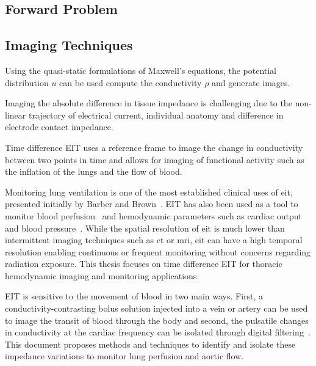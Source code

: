 \subsection{Forward Problem}

\subsection{Imaging Techniques}




Using the quasi-static 
formulations of Maxwell's equations, the potential distribution $u$ can be used 
compute the conductivity $\rho$ and generate images.


Imaging the absolute difference in tissue impedance is challenging due to the non-linear trajectory of 
electrical current, individual anatomy and difference in electrode contact impedance. 


Time difference EIT uses a reference frame to image the change in conductivity between 
two points in time and allows for imaging of functional activity such as the inflation of the lungs 
and the flow of blood.

Monitoring lung ventilation is one of the most
established clinical uses of 
\acrshort{eit}, presented initially by Barber and Brown~\parencite{Barber1984}.
EIT has also been used as a tool to monitor blood 
perfusion~\parencite{Brown1992} and hemodynamic parameters such as 
cardiac output~\parencite{Braun2018} and blood pressure~\parencite{Sola2011,Proenca2017}. 
While the spatial resolution of \acrshort{eit} is much lower than 
intermittent imaging techniques such as \acrfull{ct} or \acrfull{mri},
\acrshort{eit} can have a high temporal resolution enabling continuous or frequent 
monitoring without concerns regarding radiation exposure.
This thesis focuses on time difference EIT for thoracic hemodynamic imaging and monitoring applications. 

EIT is sensitive to the movement of blood in two main ways. First, a conductivity-contrasting 
bolus solution injected into a vein or artery can be used to image the transit of blood through the body
and second, the pulsatile changes in conductivity at the cardiac frequency can be isolated 
through digital filtering~\parencite{Leathard1994}.
This document proposes methods and techniques to identify and isolate these impedance variations
to monitor lung perfusion and 
aortic flow.

